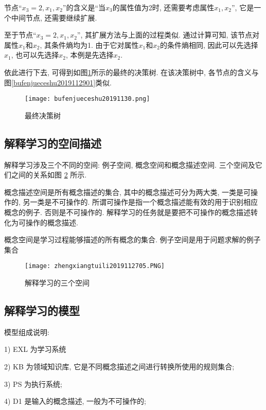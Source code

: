 节点“$x_3=2, x_1,x_2$”的含义是“当$x_3$的属性值为2时, 还需要考虑属性$x_1,x_2$”, 它是一个中间节点, 还需要继续扩展.

至于节点“$x_3=2, x_1,x_2$”, 其扩展方法与上面的过程类似. 通过计算可知, 该节点对属性$x_1$和$x_2$, 其条件熵均为1. 由于它对属性$x_1$和$x_2$的条件熵相同, 因此可以先选择$x_1$, 也可以先选择$x_2$, 本例是先选择$x_2$.

依此进行下去, 可得到如图\ref{bufenjueceshu2019112902}所示的最终的决策树. 在该决策树中, 各节点的含义与图\ref{bufenjueceshu2019112901}类似.
\begin{figure}[H]
\centering
\texttt{[image: bufenjueceshu20191130.png]}
\caption{最终决策树}
\label{bufenjueceshu2019112902}
\end{figure}
\subsection{解释学习的空间描述}
解释学习涉及三个不同的空间: 例子空间, 概念空间和概念描述空间. 三个空间及它们之间的关系如图 \ref{AI32fig2705} 所示.

概念描述空间是所有概念描述的集合, 其中的概念描述可分为两大类, 一类是可操作的, 另一类是不可操作的. 所谓可操作是指一个概念描述能有效的用于识别相应概念的例子. 否则是不可操作的. 解释学习的任务就是要把不可操作的概念描述转化为可操作的概念描述.

概念空间是学习过程能够描述的所有概念的集合. 例子空间是用于问题求解的例子集合
\begin{figure}[H]
\centering
\texttt{[image: zhengxiangtuili2019112705.PNG]}
\caption{解释学习的三个空间}
\label{AI32fig2705}
\end{figure}
\subsection{解释学习的模型}
模型组成说明:

1) EXL 为学习系统

2) KB 为领域知识库, 它是不同概念描述之间进行转换所使用的规则集合;

3) PS 为执行系统;

4) D1 是输入的概念描述, 一般为不可操作的;

